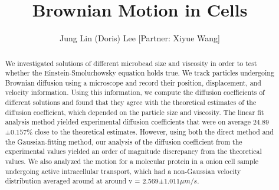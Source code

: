 \documentclass[iop,revtex4]{emulateapj_mod}
\begin{document}
\title{Brownian Motion in Cells}
\author{Jung Lin (Doris) Lee [Partner: Xiyue Wang] }
 \begin{abstract}
  We investigated solutions of different microbead size and viscosity in order to test whether the Einstein-Smoluchowsky equation holds true. We track particles undergoing Brownian diffusion using a microscope and record their position, displacement, and velocity information. Using this information, we compute the diffusion coefficients of different solutions and found that they agree with the  theoretical estimates of the diffusion coefficient, which depended on the particle size and viscosity. The linear fit analysis method yielded experimental diffusion coefficients that were on average 24.89$\pm 0.157$\% close to the theoretical estimates. However, using both the direct method and the Gaussian-fitting method, our analysis of the diffusion coefficient from the experimental values yielded an order of magnitude discrepancy from the theoretical values. We also analyzed the motion for a  molecular protein in a onion cell sample undergoing active intracellular transport, which had a non-Gaussian velocity distribution averaged around  at around v = 2.569$ \pm 1.011 \mu m/s$.
 \end{abstract}
\nocite{*} 
\end{document}
